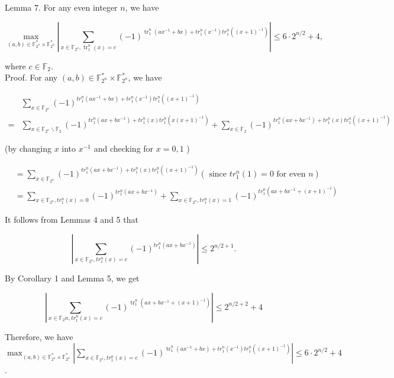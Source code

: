 \documentclass[10pt]{article}
\begin{document}
Lemma 7. For any even integer $n$, we have

$$
\max _{(a, b) \in \mathbb{F}_{2^{n}}^{*} \times \mathbb{F}_{2^{n}}^{*}}\left|\sum_{x \in \mathbb{F}_{2^{n}}, \operatorname{tr}_{1}^{n}(x)=c}(-1)^{\operatorname{tr}_{1}^{n}\left(a x^{-1}+b x\right)+t r_{1}^{n}\left(x^{-1}\right) t r_{1}^{n}\left((x+1)^{-1}\right)}\right| \leq 6 \cdot 2^{n / 2}+4,
$$

where $c \in \mathbb{F}_{2}$.\\
Proof. For any $(a, b) \in \mathbb{F}_{2^{n}}^{*} \times \mathbb{F}_{2^{n}}^{*}$, we have

$$
\begin{aligned}
& \sum_{x \in \mathbb{F}_{2^{n}}}(-1)^{t r_{1}^{n}\left(a x^{-1}+b x\right)+t r_{1}^{n}\left(x^{-1}\right) t r_{1}^{n}\left((x+1)^{-1}\right)} \\
= & \sum_{x \in \mathbb{F}_{2^{n}} \backslash \mathbb{F}_{2}}(-1)^{t r_{1}^{n}\left(a x+b x^{-1}\right)+t r_{1}^{n}(x) t r_{1}^{n}\left(x(x+1)^{-1}\right)}+\sum_{x \in \mathbb{F}_{2}}(-1)^{t r_{1}^{n}\left(a x+b x^{-1}\right)+t r_{1}^{n}(x) t r_{1}^{n}\left((x+1)^{-1}\right)}
\end{aligned}
$$

(by changing $x$ into $x^{-1}$ and checking for $x=0,1$ )

$$
\begin{aligned}
& =\sum_{x \in \mathbb{F}_{2^{n}}}(-1)^{t r_{1}^{n}\left(a x+b x^{-1}\right)+t r_{1}^{n}(x) t r_{1}^{n}\left((x+1)^{-1}\right)}\left(\text { since } t r_{1}^{n}(1)=0 \text { for even } n\right) \\
& =\sum_{x \in \mathbb{F}_{2^{n}}, t r_{1}^{n}(x)=0}(-1)^{t r_{1}^{n}\left(a x+b x^{-1}\right)}+\sum_{x \in \mathbb{F}_{2^{n}}, t r_{1}^{n}(x)=1}(-1)^{t r_{1}^{n}\left(a x+b x^{-1}+(x+1)^{-1}\right)}
\end{aligned}
$$

It follows from Lemmas 4 and 5 that

$$
\left|\sum_{x \in \mathbb{F}_{2^{n}}, t r_{1}^{n}(x)=c}(-1)^{t r_{1}^{n}\left(a x+b x^{-1}\right)}\right| \leq 2^{n / 2+1} .
$$

By Corollary 1 and Lemma 5, we get

$$
\left|\sum_{x \in \mathbb{F}_{2} n, t r_{1}^{n}(x)=c}(-1)^{\operatorname{tr}_{1}^{n}\left(a x+b x^{-1}+(x+1)^{-1}\right)}\right| \leq 2^{n / 2+2}+4
$$

Therefore, we have $\max _{(a, b) \in \mathbb{F}_{2^{n}}^{*} \times \mathbb{F}_{2^{n}}^{*}}\left|\sum_{x \in \mathbb{F}_{2^{n}}, t r_{1}^{n}(x)=c}(-1)^{\operatorname{tr}_{1}^{n}\left(a x^{-1}+b x\right)+t r_{1}^{n}\left(x^{-1}\right) t r_{1}^{n}\left((x+1)^{-1}\right)}\right| \leq 6 \cdot 2^{n / 2}+4$.
\end{document}
